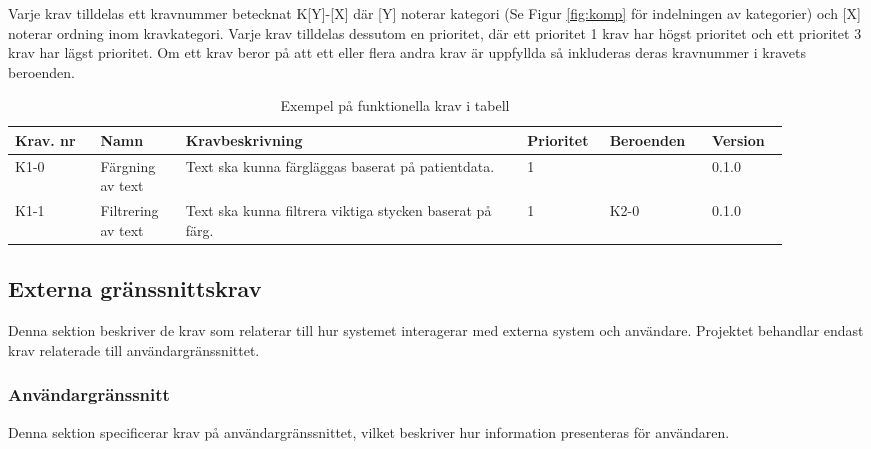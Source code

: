 \documentclass{article}
\begin{document}
Varje krav tilldelas ett kravnummer betecknat K[Y]-[X] där [Y] noterar kategori (Se Figur \ref{fig:komp} för indelningen av kategorier) och [X] noterar ordning inom kravkategori. Varje krav tilldelas dessutom en prioritet, där ett prioritet 1 krav har högst prioritet och ett prioritet 3 krav har lägst prioritet. Om ett krav beror på att ett eller flera andra krav är uppfyllda så inkluderas deras kravnummer i kravets beroenden. \\ 

\begin{table}[h]
    \caption{Exempel på funktionella krav i tabell}
    \label{tab:placeholder_label}
    \centering
    \begin{tabular}{|p{0.1\linewidth}|p{0.1\linewidth}|p{0.4\linewidth}|p{0.09\linewidth}|p{0.12\linewidth}|p{0.09\linewidth}|}
        \hline
        \textbf{Krav. nr} & \textbf{Namn} & \textbf{Kravbeskrivning} & \textbf{Prioritet} & \textbf{Beroenden}  & \textbf{Version} \\ \hline
        K1-0   & Färgning av text & Text ska kunna färgläggas baserat  på patientdata.   & 1 & & 0.1.0 \\ \hline
        K1-1   & Filtrering av text   & Text ska kunna filtrera viktiga stycken baserat på färg. & 1 & K2-0 & 0.1.0 \\ \hline
    \end{tabular}
\end{table}

\subsection{Externa gränssnittskrav}
Denna sektion beskriver de krav som relaterar till hur systemet interagerar med externa system och användare. Projektet behandlar endast krav relaterade till användargränssnittet.

\subsubsection{Användargränssnitt}
Denna sektion specificerar krav på användargränssnittet, vilket beskriver hur information presenteras för användaren. 
\end{document}
